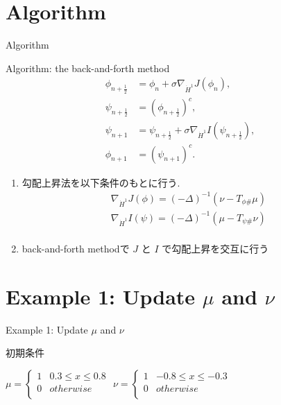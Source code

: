 \documentclass[dvipdfmx, 12pt]{beamer}
\begin{document}
\begin{comment}
\end{comment}






\section{Algorithm}
\begin{frame}{Algorithm}
    \begin{block}{Algorithm: the back-and-forth method}
        \begin{align*}
            \phi_{n + \frac{1}{2}} &= \phi_{n} + \sigma \nabla_{\dot{H}^1} J(\phi_{n}),\\
            \psi_{n + \frac{1}{2}} &= (\phi_{n + \frac{1}{2}})^c,\\
            \psi_{n + 1} &= \psi_{n + \frac{1}{2}} + \sigma \nabla_{\dot{H}^1} I(\psi_{n + \frac{1}{2}}),\\
            \phi_{n + 1} &= (\psi_{n + 1})^c.
        \end{align*}
    \end{block}

    \begin{enumerate}
        \item 勾配上昇法を以下条件のもとに行う.
        \begin{align*}
            \nabla_{\dot{H}^1} J(\phi) = (- \Delta)^{-1} (\nu - T_{\phi \#} \mu)\\
            \nabla_{\dot{H}^1} I(\psi) = (- \Delta)^{-1} (\mu - T_{\psi \#} \nu)\\
        \end{align*}
        \item back-and-forth methodで $J$ と $I$ で勾配上昇を交互に行う
    \end{enumerate}

\end{frame}

\section{Example 1: Update $\mu$ and $\nu$}
\begin{frame}{Example 1: Update $\mu$ and $\nu$}


    初期条件
    \begin{center}
    $\mu = \left\{
        \begin{array}{ll}
            1 & 0.3 \le x \le 0.8 \\
            0 & otherwise \\
        \end{array}
    \right.
    $
    $\nu = \left\{
        \begin{array}{ll}
            1 & - 0.8 \le x \le - 0.3 \\
            0 & otherwise \\
        \end{array}
    \right.
    $
    \end{center}

\end{frame}
\end{document}
